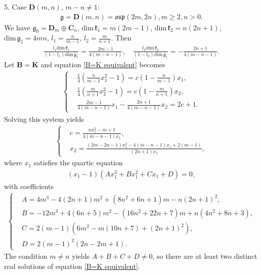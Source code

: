 \documentclass[reqno]{amsart}
\theoremstyle{definition}
\begin{document}
5. Case $\mathbf{D}(m,n)$, $m-n\neq 1$:
\begin{eqnarray*}
\mathfrak{g}=\mathbf{D}(m,n)=\mathfrak{osp}(2m,2n),m\geq 2,n>0.
\end{eqnarray*}
We have
$\mathfrak{g}_{\bar{0}}=\mathbf{D}_{m}\oplus \mathbf{C}_{n}$, $\mathrm{dim}\,\mathfrak{k}_{1}=m(2m-1)$, $\mathrm{dim}\,\mathfrak{k}_{2}=n(2n+1)$, $\mathrm{dim}\,\mathfrak{g}_{\bar{1}}=4mn$, $l_{1}=\frac{n}{m-1}$, $l_{2}=\frac{m}{n+1}$. Then
\begin{eqnarray*}
\frac{l_{1}\mathrm{dim}\,\mathfrak{k}_{1}}{(1-l_{1})\mathrm{dim}\,\mathfrak{g}_{\bar{1}}}=\frac{2m-1}{4(m-n-1)},\quad
\frac{l_{2}\mathrm{dim}\,\mathfrak{k}_{2}}{(1-l_{2})\mathrm{dim}\,\mathfrak{g}_{\bar{1}}}=-\frac{2n+1}{4(m-n-1)}.
\end{eqnarray*}
Let $\mathbf{B}=\mathbf{K}$ and equation \eqref{B=K equivalent} becomes
\begin{eqnarray*}
\left\{
\begin{aligned}
&\frac{1}{4}\left(\frac{n}{m-1}x_{1}^{2}-1\right)=c\left(1-\frac{n}{m-1}\right)x_{1},\\
&\frac{1}{4}\left(\frac{m}{n+1}x_{2}^{2}-1\right)=c\left(1-\frac{m}{n+1}\right)x_{2},\\
&\frac{2m-1}{4(m-n-1)}x_{1}-\frac{2n+1}{4(m-n-1)}x_{2}=2c+1.
\end{aligned}\right.
\end{eqnarray*}
Solving this system yields
\begin{eqnarray*}
\left\{
\begin{aligned}
&c=\frac{nx_{1}^{2}-m+1}{4(m-n-1)x_{1}},\\
&x_{2}=\frac{(2m-2n-1)x_{1}^{2}-4(m-n-1)x_{1}+2(m-1)}{(2n+1)x_{1}},
\end{aligned}\right.
\end{eqnarray*}
where  $x_{1}$ satisfies the quartic equation
\begin{eqnarray*}
(x_{1}-1)(A x_{1}^{3}+B x_{1}^{2}+C x_{1}+D)=0,
\end{eqnarray*}
with coefficients
\begin{eqnarray*}
\left\{
\begin{aligned}
&A=4m^{3}-4(2n+1)m^{2}+( 8n^{2}+6n+1)m-n(2n+1)^{2},\\
&B=-12m^{3}+4(6n+5)m^{2}-(16n^{2}+22n+7)m+n(4n^{2}+8n+3),\\
&C=2(m-1)\left( 6m^{2}-m(10n+7)+(2n+1)^{2}\right),\\
&D=2(m-1)^{2}(2n-2m+1).
\end{aligned}\right.
\end{eqnarray*}
The condition $m\neq n$ yields $A+B+C+D\neq0$,
so there are at least two   distinct real solutions of equation \eqref{B=K equivalent}.
\end{document}
